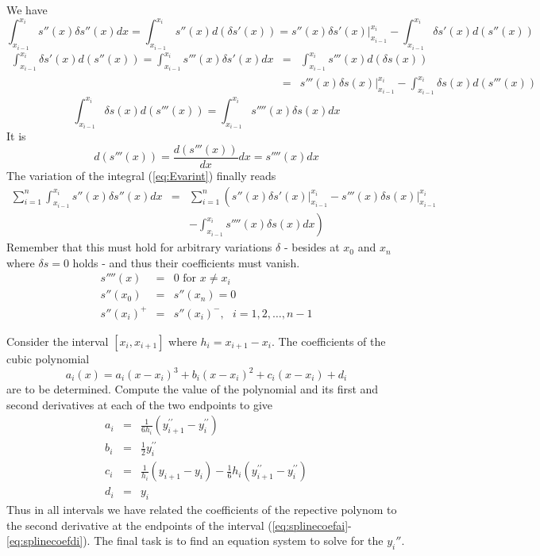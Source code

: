 We have
\[
\int_{x_{i-1}}^{x_i}s''(x)\delta s'' (x) dx=\int_{x_{i-1}}^{x_i}s''(x)d(\delta s' (x))= \left. {s''(x)\delta s'(x)}\right|_{x_{i-1}}^{x_i}-\int_{x_{i-1}}^{x_i}\delta s' (x)d(s''(x))
\]
\begin{eqnarray*}
\int_{x_{i-1}}^{x_i}\delta s' (x)d(s''(x))=\int_{x_{i-1}}^{x_i}s'''(x)\delta s' (x)dx&=&
\int_{x_{i-1}}^{x_i}s'''(x)d(\delta s(x))\\[1ex]
&=&\left. {s'''(x)\delta s(x)}\right|_{x_{i-1}}^{x_i}-\int_{x_{i-1}}^{x_i} \delta s(x) d(s'''(x))
\end{eqnarray*}
\[
\int_{x_{i-1}}^{x_i} \delta s(x) d(s'''(x))=\int_{x_{i-1}}^{x_i} s''''(x)\delta s(x) dx
\]
It is
\[
d(s'''(x))= \frac{d(s'''(x))}{dx}dx= s''''(x) dx
\]
The variation of the integral (\ref{eq:Evarint})
finally reads
\begin{eqnarray*}
\sum_{i=1}^n\int_{x_{i-1}}^{x_i}s''(x)\delta s'' (x)dx
&=&\sum_{i=1}^n\left(\left. s''(x)\delta s'(x)\right|_{x_{i-1}}^{x_i}-\left.
s'''(x)\delta s(x)\right|_{x_{i-1}}^{x_i}\right. \\[1ex]
&&\left. -\int_{x_{i-1}}^{x_i} s''''(x)\delta s(x)dx\right)
\end{eqnarray*}
Remember that this must hold for arbitrary variations $\delta$ - besides at $x_0$ and $x_n$ where $\delta s=0$ holds - and thus their coefficients must vanish. 
\begin{eqnarray*}
s''''(x)&=&0 \text{ for } x\neq x_i
\\
s''(x_0)&=&s''(x_n)=0
\\
s''(x_i)^+&=&s''(x_i)^-,\ \ \ i=1,2,\ldots,n-1
\end{eqnarray*}

Consider the interval $[x_i,x_{i+1}]$ where $h_i=x_{i+1}-x_i$. The coefficients
of the cubic polynomial
\[ a_i(x)=a_i(x-x_i)^3+b_i(x-x_i)^2+c_i(x-x_i)+d_i \]
are to be determined. Compute the value of the polynomial and its first and
second derivatives at each of the two endpoints to give
\begin{eqnarray}
	  a_i&=&\frac{1}{6h_i}(y^{\prime\prime}_{i+1}
	        -y^{\prime\prime}_{i})\label{eq:splinecoefai} \\
	  b_i&=&\frac{1}{2} y^{\prime\prime}_{i}\label{eq:splinecoefbi}\\
	  c_i&=&\frac{1}{h_i}(y_{i+1}-y_i)-\frac{1}{6}h_i (y^{\prime\prime}_{i+1}
	        -y^{\prime\prime}_{i})\label{eq:splinecoefci}\\
	  d_i&=&y_i\label{eq:splinecoefdi}
  \end{eqnarray}
Thus in all intervals we have related the coefficients of the repective polynom
to the second derivative at the endpoints of the interval
(\ref{eq:splinecoefai}-\ref{eq:splinecoefdi}). The final task is to find an equation system to solve
for the $y_i''$.


